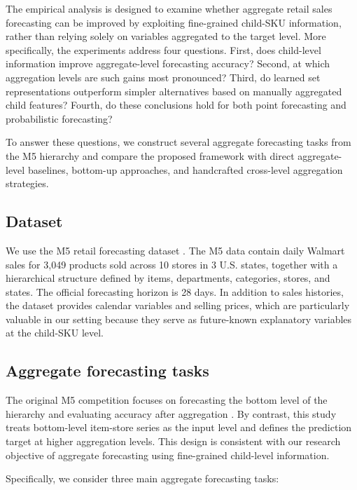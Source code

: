 \documentclass[12pt]{article}
\begin{document}
The empirical analysis is designed to examine whether aggregate retail sales forecasting can be improved by exploiting fine-grained child-SKU information, rather than relying solely on variables aggregated to the target level. More specifically, the experiments address four questions. First, does child-level information improve aggregate-level forecasting accuracy? Second, at which aggregation levels are such gains most pronounced? Third, do learned set representations outperform simpler alternatives based on manually aggregated child features? Fourth, do these conclusions hold for both point forecasting and probabilistic forecasting?

To answer these questions, we construct several aggregate forecasting tasks from the M5 hierarchy and compare the proposed framework with direct aggregate-level baselines, bottom-up approaches, and handcrafted cross-level aggregation strategies.

\subsection{Dataset}

We use the M5 retail forecasting dataset \parencite{makridakis2022m5bg}. The M5 data contain daily Walmart sales for 3,049 products sold across 10 stores in 3 U.S. states, together with a hierarchical structure defined by items, departments, categories, stores, and states. The official forecasting horizon is 28 days. In addition to sales histories, the dataset provides calendar variables and selling prices, which are particularly valuable in our setting because they serve as future-known explanatory variables at the child-SKU level.

\subsection{Aggregate forecasting tasks}

The original M5 competition focuses on forecasting the bottom level of the hierarchy and evaluating accuracy after aggregation  \parencite{makridakis2022m5accuracy, MAKRIDAKIS20221365}. By contrast, this study treats bottom-level item-store series as the input level and defines the prediction target at higher aggregation levels. This design is consistent with our research objective of aggregate forecasting using fine-grained child-level information.

Specifically, we consider three main aggregate forecasting tasks:
\end{document}
